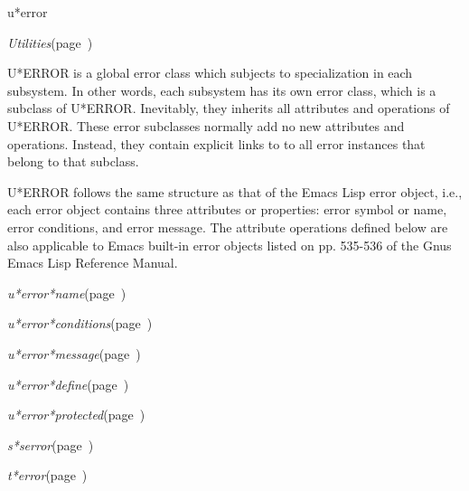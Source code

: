 \begin{description}
\item [Name:]  u*error

\item [Layer:] {\sl Utilities}\hfill(page~\pageref{Utilities})

\item [Description:]

U*ERROR is a global error class which subjects to specialization in
each subsystem. In other words, each subsystem has its own error
class, which is a subclass of U*ERROR. Inevitably, they inherits all
attributes and operations of U*ERROR. These error subclasses normally
add no new attributes and operations. Instead, they contain explicit
links to to all error instances that belong to that subclass.

U*ERROR follows the same structure as that of the Emacs Lisp error
object, i.e., each error object contains three attributes or
properties: error symbol or name, error conditions, and error message.
The attribute operations defined below are also applicable to Emacs
built-in error objects listed on pp. 535-536 of the Gnus Emacs Lisp
Reference Manual.

\item [Attributes:]
\item {\sl u*error*name}\hfill(page~\pageref{u*error*name})
\item {\sl u*error*conditions}\hfill(page~\pageref{u*error*conditions})
\item {\sl u*error*message}\hfill(page~\pageref{u*error*message})

\item [Operations:]
\item {\sl u*error*define}\hfill(page~\pageref{u*error*define})
\item {\sl u*error*protected}\hfill(page~\pageref{u*error*protected})

\item [Collections:]

\item [Subclasses:]
\item {\sl s*serror}\hfill(page~\pageref{s*serror})
\item {\sl t*error}\hfill(page~\pageref{t*error})

\item [Superclasses:]




\end{description}
\horizontalline

